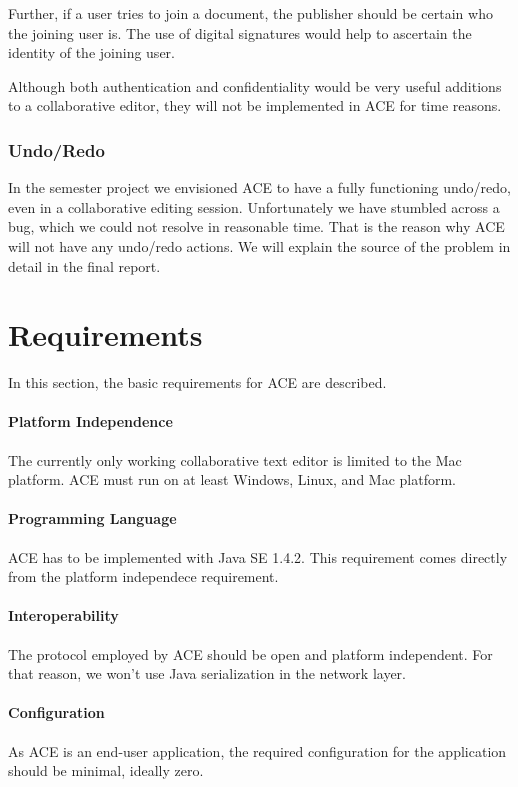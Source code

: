 \documentclass[11pt,a4paper]{article}
\begin{document}
Further, if a user tries to join a document, the publisher should be certain 
who the joining user is. The use of digital signatures would help to 
ascertain the identity of the joining user.

Although both authentication and confidentiality would be very useful additions
to a collaborative editor, they will not be implemented in ACE for time 
reasons.

\subsubsection{Undo/Redo}
In the semester project we envisioned ACE to have a fully functioning 
undo/redo, even in a collaborative editing session. Unfortunately we have 
stumbled across a bug, which we could not resolve in reasonable time. That is 
the reason why ACE will not have any undo/redo actions. We will explain the 
source of the problem in detail in the final report. 


\section{Requirements}

In this section, the basic requirements for ACE are described.

\paragraph{Platform Independence}
The currently only working collaborative text editor is limited to the Mac
platform. ACE must run on at least Windows, Linux, and Mac platform.

\paragraph{Programming Language}
ACE has to be implemented with Java SE 1.4.2. This requirement comes directly
from the platform independece requirement.

\paragraph{Interoperability}
The protocol employed by ACE should be open and platform independent. 
For that reason, we won't use Java serialization in the network layer.

\paragraph{Configuration}
As ACE is an end-user application, the required configuration for the 
application should be minimal, ideally zero.
\end{document}
